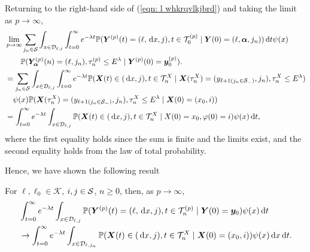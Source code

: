 Returning to the right-hand side of (\ref{eqn: l whkrqvlkjbrd}) and taking the limit as \(p\to\infty\), 
\begin{align}
	&\lim_{p\to\infty} \sum_{j_n\in\mathcal S}
	\int_{x\in\mathcal{D}_{\ell,j}} \int_{t=0}^\infty e^{-\lambda t} \mathbb P({\boldsymbol Y}^{(p)}(t) = (\ell,\, \mathrm{d} x, j), 
	t\in\mathcal T_0^{(p)} \mid \nonumber 
	 \boldsymbol Y(0) = (\ell,\boldsymbol\alpha,j_n))\, \mathrm{d} t \psi(x)
	 \\&\qquad{}  \mathbb P(\bm{Y}_{\bm{\alpha}}^{(p)}(n) = (\ell, j_n), \tau_{n}^{(p)}\leq E^\lambda 
	 \mid \boldsymbol Y^{(p)}(0)=\boldsymbol y_0^{(p)}).\label{eqn: eieieie}
	 \\&=\sum_{j_n\in\mathcal S}\int_{x\in\mathcal{D}_{\ell,j}} \int_{t=0}^\infty e^{-\lambda t} \mathbb P(\boldsymbol X(t)\in(\, \mathrm{d} x, j), t\in\mathcal T_n^{X} \mid \boldsymbol X(\tau_n^X) = (y_{\ell+1(j_n\in\mathcal S_-)}, j_n),\nonumber 
	 \tau_n^X\leq E^\lambda ) 
	 \\&\quad{} \psi(x)\mathbb P(\boldsymbol X(\tau_n^X) = (y_{\ell+1(j_{n}\in\mathcal S_-)}, 
		j_n), \tau_{n}^X\leq E^\lambda
		\mid \boldsymbol X(0)=(x_0,i))\nonumber
	\\&= \int_{t=0}^\infty e^{-\lambda t}  \int_{x\in\mathcal{D}_{\ell,j}}\mathbb P(\boldsymbol X(t)\in(\, \mathrm{d} x, j), t\in\mathcal T_n^{X} 
	\mid X(0)=x_0, \varphi(0)=i)\psi(x)\, \mathrm{d} t,
\end{align}
where the first equality holds since the sum is finite and the limits exist, and the second equality holds from the law of total probability. 

Hence, we have shown the following result 
\begin{lem}\label{lem: LAkAKFnvnb mav h}
	For \(\ell,\ell_0\in\mathcal K\), \(i,j\in\mathcal{S}\), \(n\geq 0\), then, as \(p\to\infty\), 
	\begin{align} 
		&\int_{t=0}^\infty e^{-\lambda t}\int_{x\in\mathcal{D}_{\ell,j}}\mathbb P({\boldsymbol Y}^{(p)}(t) = (\ell,\, \mathrm{d} x, j), t\in\mathcal T_n^{(p)} \mid  \nonumber 
		\boldsymbol Y(0) = \boldsymbol y_0)\psi(x)\, \mathrm{d} t \nonumber
		\\&\to\int_{t=0}^\infty e^{-\lambda t}  \int_{x\in\mathcal{D}_{\ell,j_n}}\mathbb P(\boldsymbol X(t)\in(\, \mathrm{d} x, j), t\in\mathcal T_n^{X} 
		\mid \boldsymbol X(0)=(x_0,i))\psi(x)\, \mathrm{d} x\, \mathrm{d} t.
	\end{align}
\end{lem}

